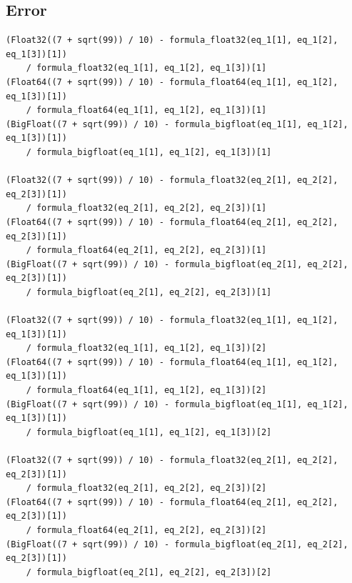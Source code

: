 \documentclass[12pt]{article}
\begin{document}
    \subsection*{Error}
    \begin{verbatim}
(Float32((7 + sqrt(99)) / 10) - formula_float32(eq_1[1], eq_1[2], eq_1[3])[1]) 
    / formula_float32(eq_1[1], eq_1[2], eq_1[3])[1]
(Float64((7 + sqrt(99)) / 10) - formula_float64(eq_1[1], eq_1[2], eq_1[3])[1]) 
    / formula_float64(eq_1[1], eq_1[2], eq_1[3])[1]
(BigFloat((7 + sqrt(99)) / 10) - formula_bigfloat(eq_1[1], eq_1[2], eq_1[3])[1]) 
    / formula_bigfloat(eq_1[1], eq_1[2], eq_1[3])[1]

(Float32((7 + sqrt(99)) / 10) - formula_float32(eq_2[1], eq_2[2], eq_2[3])[1]) 
    / formula_float32(eq_2[1], eq_2[2], eq_2[3])[1]
(Float64((7 + sqrt(99)) / 10) - formula_float64(eq_2[1], eq_2[2], eq_2[3])[1]) 
    / formula_float64(eq_2[1], eq_2[2], eq_2[3])[1]
(BigFloat((7 + sqrt(99)) / 10) - formula_bigfloat(eq_2[1], eq_2[2], eq_2[3])[1]) 
    / formula_bigfloat(eq_2[1], eq_2[2], eq_2[3])[1]

(Float32((7 + sqrt(99)) / 10) - formula_float32(eq_1[1], eq_1[2], eq_1[3])[1]) 
    / formula_float32(eq_1[1], eq_1[2], eq_1[3])[2]
(Float64((7 + sqrt(99)) / 10) - formula_float64(eq_1[1], eq_1[2], eq_1[3])[1]) 
    / formula_float64(eq_1[1], eq_1[2], eq_1[3])[2]
(BigFloat((7 + sqrt(99)) / 10) - formula_bigfloat(eq_1[1], eq_1[2], eq_1[3])[1]) 
    / formula_bigfloat(eq_1[1], eq_1[2], eq_1[3])[2]

(Float32((7 + sqrt(99)) / 10) - formula_float32(eq_2[1], eq_2[2], eq_2[3])[1]) 
    / formula_float32(eq_2[1], eq_2[2], eq_2[3])[2]
(Float64((7 + sqrt(99)) / 10) - formula_float64(eq_2[1], eq_2[2], eq_2[3])[1]) 
    / formula_float64(eq_2[1], eq_2[2], eq_2[3])[2]
(BigFloat((7 + sqrt(99)) / 10) - formula_bigfloat(eq_2[1], eq_2[2], eq_2[3])[1]) 
    / formula_bigfloat(eq_2[1], eq_2[2], eq_2[3])[2]
    \end{verbatim}
\end{document}
